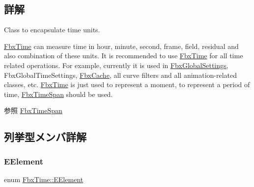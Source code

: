 \subsection{詳解}
Class to encapsulate time units.

\hyperlink{class_fbx_time}{Fbx\+Time} can measure time in hour, minute, second, frame, field, residual and also combination of these units. It is recommended to use \hyperlink{class_fbx_time}{Fbx\+Time} for all time related operations. For example, currently it is used in \hyperlink{class_fbx_global_settings}{Fbx\+Global\+Settings}, Fbx\+Global\+Time\+Settings, \hyperlink{class_fbx_cache}{Fbx\+Cache}, all curve filters and all animation-\/related classes, etc. \hyperlink{class_fbx_time}{Fbx\+Time} is just used to represent a moment, to represent a period of time, \hyperlink{class_fbx_time_span}{Fbx\+Time\+Span} should be used. \begin{DoxySeeAlso}{参照}
\hyperlink{class_fbx_time_span}{Fbx\+Time\+Span} 
\end{DoxySeeAlso}


\subsection{列挙型メンバ詳解}
\mbox{\label{class_fbx_time_aebc9578f91df69fa2937911047893014}} 
\subsubsection{\texorpdfstring{E\+Element}{EElement}}
{\footnotesize\ttfamily enum \hyperlink{class_fbx_time_aebc9578f91df69fa2937911047893014}{Fbx\+Time\+::\+E\+Element}}

